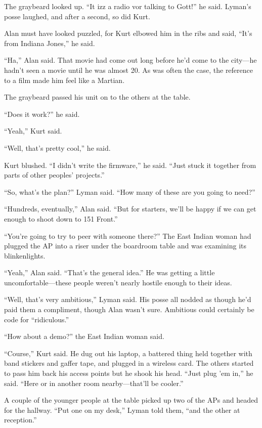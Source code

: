 The graybeard looked up.  ``It izz a radio vor talking to Gott!'' he
said.  Lyman's posse laughed, and after a second, so did Kurt.

Alan must have looked puzzled, for Kurt elbowed him in the ribs and
said, ``It's from Indiana Jones,'' he said.

``Ha,'' Alan said.  That movie had come out long before he'd come to
the city---he hadn't seen a movie until he was almost 20.  As was
often the case, the reference to a film made him feel like a Martian.

The graybeard passed his unit on to the others at the table.

``Does it work?'' he said.

``Yeah,'' Kurt said.

``Well, that's pretty cool,'' he said.

Kurt blushed.  ``I didn't write the firmware,'' he said.  ``Just stuck
it together from parts of other peoples' projects.''

``So, what's the plan?'' Lyman said.  ``How many of these are you
going to need?''

``Hundreds, eventually,'' Alan said.  ``But for starters, we'll be
happy if we can get enough to shoot down to 151 Front.''

``You're going to try to peer with someone there?'' The East Indian
woman had plugged the AP into a riser under the boardroom table and
was examining its blinkenlights.

``Yeah,'' Alan said.  ``That's the general idea.'' He was getting a
little uncomfortable---these people weren't nearly hostile enough to
their ideas.

``Well, that's very ambitious,'' Lyman said.  His posse all nodded as
though he'd paid them a compliment, though Alan wasn't sure. 
Ambitious could certainly be code for ``ridiculous.''

``How about a demo?'' the East Indian woman said.

``Course,'' Kurt said.  He dug out his laptop, a battered thing held
together with band stickers and gaffer tape, and plugged in a wireless
card.  The others started to pass him back his access points but he
shook his head.  ``Just plug 'em in,'' he said.  ``Here or in another
room nearby---that'll be cooler.''

A couple of the younger people at the table picked up two of the APs
and headed for the hallway.  ``Put one on my desk,'' Lyman told them,
``and the other at reception.''

